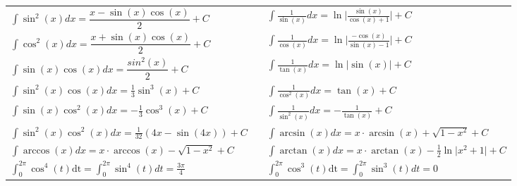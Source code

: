 \begin{multicols*}{2}
    \begin{center}
        \renewcommand{\arraystretch}{1.5}
        \begin{tabular}{l c l} \toprule
            $\displaystyle \int \sin^2(x) dx = \dfrac{x - \sin(x)\cos(x)}{2} + C$                                    & \hspace*{+10pt} & $\displaystyle \int\frac{1}{\sin{(x)}}dx =\ln{\vert\frac{\sin{(x)}}{\cos{(x)}+1}\vert} + C$             \\
            $\displaystyle \int \cos^2(x) dx = \dfrac{x + \sin(x)\cos(x)}{2} + C$                                    & \hspace*{+10pt} & $\displaystyle \int\frac{1}{\cos{(x)}}dx =\ln{\vert\frac{-\cos{(x)}}{\sin{(x)}-1}\vert} + C$            \\
            $\displaystyle \int \sin(x) \cos(x) dx = \dfrac{sin^2(x)}{2} + C$                                        & \hspace*{+10pt} & $\displaystyle \int \frac{1}{\tan(x)} dx =\ln\vert \sin(x) \vert + C$                                   \\
            $\displaystyle \int \sin^2(x)\cos(x)dx = \frac{1}{3}\sin^3(x) + C$                                       & \hspace*{+10pt} & $\displaystyle \int \frac{1}{\cos^2(x)}dx =\tan(x) + C$                                                 \\
            $\displaystyle \int \sin(x)\cos^2(x)dx = -\frac{1}{3}\cos^3(x) + C$                                      & \hspace*{+10pt} & $\displaystyle \int \frac{1}{\sin^2{(x)}}dx =-\frac{1}{\tan{(x)}} + C$                                  \\
            $\displaystyle \int \sin^2(x)\cos^2(x)dx = \frac{1}{32}(4x-\sin(4x)) + C$                                & \hspace*{+10pt} & $\displaystyle \int \arcsin(x)dx = x\cdot \arcsin(x)+\sqrt{1-x^2} + C$                                  \\
            $\displaystyle \int \arccos(x)dx =x\cdot \arccos(x)-\sqrt{1-x^2} + C$                                    & \hspace*{+10pt} & $\displaystyle \int \arctan(x)dx =x\cdot \arctan(x)-\frac{1}{2}\ln \vert x^2+1\vert + C$                \\
            \midrule
            $\displaystyle \int_0^{2\pi}\cos^4(t)\text{dt} =\displaystyle \int_0^{2\pi}\sin^4(t)dt = \frac{3\pi}{4}$ & \hspace*{+10pt} & $\displaystyle \int_0^{2\pi}\cos^3(t)\text{dt} =\displaystyle \int_0^{2\pi}\sin^3(t)dt = 0$             \\

\end{tabular}
\end{center}
\end{multicols*}
